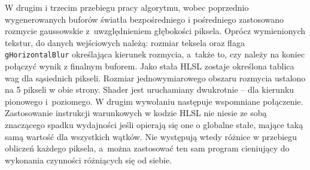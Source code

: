 		W drugim i trzecim przebiegu pracy algorytmu, wobec poprzednio wygenerowanych buforów światła bezpośredniego i pośredniego zastosowano rozmycie gaussowskie z~uwzględnieniem głębokości piksela. Oprócz wymienionych tekstur, do danych wejściowych należą: rozmiar teksela oraz flaga \texttt{gHorizontalBlur} określająca kierunek rozmycia, a~także to, czy należy na koniec połączyć wynik z finalnym buforem. Jako stała HLSL zostaje określona tablica wag dla sąsiednich pikseli. Rozmiar jednowymiarowego obszaru rozmycia ustalono na 5 pikseli w obie strony. Shader jest uruchamiany dwukrotnie -- dla kierunku pionowego i~poziomego. W drugim wywołaniu następuje wspomniane połączenie. 
		Zastosowanie instrukcji warunkowych w kodzie HLSL nie niesie ze sobą znaczącego spadku wydajności jeśli opierają się one o globalne stałe, mające taką samą wartość dla wszystkich wątków. Nie występują wtedy różnice w przebiegu obliczeń każdego piksela, a~można zastosować ten sam program cieniujący do wykonania czynności różniących się od siebie.\raggedbottom\pagebreak
		
